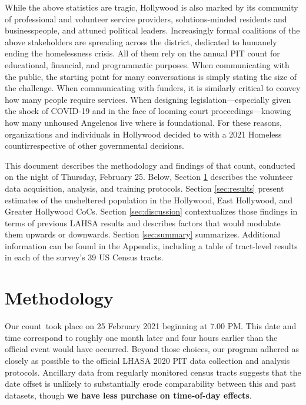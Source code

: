 \documentclass[11pt,twocolumn]{article}
\def\bfr{\bf\color{red}}
\def\Count{count}
\begin{document}
While the above statistics are tragic, Hollywood is also marked by its community of professional
and volunteer service providers, solutions-minded residents and businesspeople, and attuned political 
leaders. Increasingly formal coalitions of the above stakeholders are spreading across the district, dedicated 
to humanely ending the homelessness crisis. All of them rely on the annual PIT count for educational, 
financial, and programmatic purposes. When communicating with the public, the starting point for 
many conversations is simply stating the size of the challenge. When communicating with funders, it is 
similarly critical to convey how many people require services. When designing legislation---especially given 
the shock of COVID-19 and in the face of looming court proceedings---knowing how many unhoused 
Angelenos live where is foundational. For these reasons, organizations and individuals in Hollywood 
decided to with a 2021 Homeless \Count irrespective of other governmental decisions.

This document describes the methodology and findings of that \Count, conducted on the night of 
Thursday, February 25. Below, Section \ref{sec:procedure} describes the volunteer data acquisition, 
analysis, and training protocols. Section \ref{sec:results} present estimates of the unsheltered 
population in the Hollywood, East Hollywood, and Greater Hollywood CoCs. Section \ref{sec:discussion}
contextualizes those findings in terms of previous LAHSA results and describes factors that would
modulate them upwards or downwards. Section \ref{sec:summary} summarizes. Additional information
can be found in the Appendix, including a table of tract-level results in each of the survey's 39 US 
Census tracts.

\section{Methodology}
\label{sec:procedure}

Our \Count\ took place on 25 February 2021 beginning at 7.00 PM. This date and time correspond to 
roughly one month later and four hours earlier than the official event would have occurred. Beyond
those choices, our program adhered as closely as possible to the official LHASA 2020 PIT data 
collection and analysis protocols. Ancillary data from regularly monitored census tracts suggests 
that the date offset is unlikely to substantially erode comparability between this and past datasets, 
though {\bfr we have less purchase on time-of-day effects}.
\end{document}
